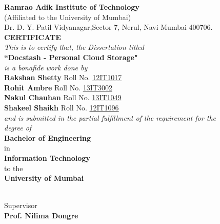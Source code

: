\begin{center}
\begin{figure*}[h]
\centerline{}
\end{figure*}
{\huge \bf Ramrao Adik Institute of Technology}\\
{\normalsize(Affiliated to the University of Mumbai)}\\
{\normalsize Dr. D. Y. Patil Vidyanagar,Sector 7, Nerul, Navi Mumbai 400706.}\\
\vspace{0.2in}
{\LARGE \bf {CERTIFICATE}}\\
\vspace{0.2in}
{\large\it This is to certify that, the Dissertation titled}\\
\vspace{0.1in}
{\Large \bf ``Docstash - Personal Cloud Storage"}\\
\vspace{0.1in}
{\large \it is a bonafide work done by}\\
\vspace{0.2in}
{\large \bf Rakshan Shetty} Roll No. \underline{12IT1017}\\
{\large \bf Rohit Ambre} Roll No. \underline{13IT3002}\\
{\large \bf Nakul Chauhan} Roll No. \underline{13IT1049}\\
{\large \bf Shakeel Shaikh} Roll No. \underline{12IT1096}\\
\vspace{0.1in}
{\large \it and is submitted in the partial fulfillment of the requirement for the}\\
{\large \it degree of}\\
\vspace{0.1in}
{\large \bf {Bachelor of Engineering}}\\
\vspace{-0.1in}
{\large in} \\
\vspace{-0.1in}
{\large \bf {Information Technology}}\\
\vspace{-0.1in}
{\large to the} \\
\vspace{-0.1in}
{\large \bf University of Mumbai}\\
\begin{figure*}[h]
\centerline{}
\end{figure*}
\underline{\hspace{4cm}}\\
{\normalsize Supervisor}\\
{\large\bf Prof. Nilima Dongre}\\
\end{center}

